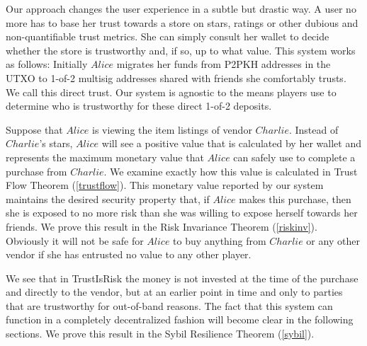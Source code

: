 \documentclass[11pt]{llncs}
\theoremstyle{definition}
\begin{document}
     Our approach changes the user experience in a subtle but drastic way. A user no more has to base her trust towards a
     store on stars, ratings or other dubious and non-quantifiable trust metrics. She can simply consult her wallet to
     decide whether the store is trustworthy and, if so, up to what value. This system works as follows: Initially $Alice$
     migrates her funds from P2PKH addresses in the UTXO \cite{bitcoinguide} to 1-of-2 multisig addresses shared with friends
     she comfortably trusts. We call this direct trust. Our system is agnostic to the means players use to determine who is
     trustworthy for these direct 1-of-2 deposits.

     Suppose that $Alice$ is viewing the item listings of vendor $Charlie$. Instead of $Charlie$'s stars, $Alice$ will see a
     positive value that is calculated by her wallet and represents the maximum monetary value that $Alice$ can safely use to
     complete a purchase from $Charlie$. We examine exactly how this value is calculated in Trust Flow Theorem
     (\ref{trustflow}). This monetary value reported by our system maintains the desired security property that, if $Alice$
     makes this purchase, then she is exposed to no more risk than she was willing to expose herself towards her friends.
     We prove this result in the Risk Invariance Theorem (\ref{riskinv}). Obviously it will not be safe for $Alice$ to buy
     anything from $Charlie$ or any other vendor if she has entrusted no value to any other player.

     We see that in TrustIsRisk the money is not invested at the time of the purchase and directly to the vendor, but at an
     earlier point in time and only to parties that are trustworthy for out-of-band reasons. The fact that this system can
     function in a completely decentralized fashion will become clear in the following sections. We prove this result in the
     Sybil Resilience Theorem (\ref{sybil}).

     
\end{document}
